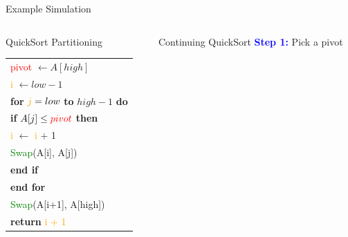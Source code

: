 \documentclass{beamer}
\begin{document}
\begin{frame}[t]{Example Simulation}
    \begin{columns}[T]
        \begin{column}{0.55\textwidth}
            \begin{exampleblock}{QuickSort Partitioning}
                \scriptsize
                \begin{tabular}{l}
                    \hspace{0.5cm} \textcolor{red}{pivot} $\gets A[high]$ \\[0.1cm]
                    \hspace{0.5cm} \textcolor{orange}{i} $\gets low - 1$ \\[0.1cm]
                    \hspace{0.5cm} \textbf{for} $\textcolor{orange}{j} = low$ \textbf{to} $high - 1$ \textbf{do} \\[0.1cm]
                    \hspace{1cm} \textbf{if} $A[j] \leq \textcolor{red}{pivot}$ \textbf{then} \\[0.1cm]
                    \hspace{1cm} \textcolor{orange}{i} $\gets$ \textcolor{orange}{i} + 1 \\[0.1cm]
                    \hspace{1cm} \textcolor{green}{Swap}(A[i], A[j]) \\[0.1cm]
                    \hspace{1cm} \textbf{end if} \\[0.1cm]
                    \hspace{0.5cm} \textbf{end for} \\[0.1cm]
                    \hspace{0.5cm} \textcolor{green}{Swap}(A[i+1], A[high]) \\[0.1cm]
                    \hspace{0.5cm} \textbf{return} \textcolor{orange}{i + 1}
                \end{tabular}
            \end{exampleblock}
        \end{column}
        \begin{column}{0.4\textwidth}
            \vspace{.5cm}
            \begin{block}{Continuing QuickSort}
                \scriptsize
                \textbf{\textcolor{blue}{Step 1:}} Pick a pivot \\[0.1cm]

\end{block}
\end{column}
\end{columns}
\end{frame}
\end{document}
